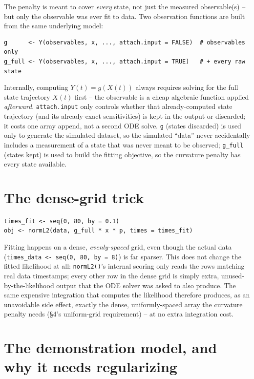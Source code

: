 \documentclass[11pt]{article}
\newcommand{\code}[1]{\texttt{#1}}
\begin{document}
The penalty is meant to cover \emph{every} state, not just the measured
observable(s) -- but only the observable was ever fit to data. Two
observation functions are built from the same underlying model:
\begin{lstlisting}
g      <- Y(observables, x, ..., attach.input = FALSE)  # observables only
g_full <- Y(observables, x, ..., attach.input = TRUE)   # + every raw state
\end{lstlisting}
Internally, computing $Y(t)=g(X(t))$ always requires solving for the full
state trajectory $X(t)$ first -- the observable is a cheap algebraic
function applied \emph{afterward}. \code{attach.input} only controls
whether that already-computed state trajectory (and its already-exact
sensitivities) is kept in the output or discarded; it costs one array
append, not a second ODE solve. \code{g} (states discarded) is used only to
generate the simulated dataset, so the simulated ``data'' never
accidentally includes a measurement of a state that was never meant to be
observed; \code{g\_full} (states kept) is used to build the fitting
objective, so the curvature penalty has every state available.

\section{The dense-grid trick}

\begin{lstlisting}
times_fit <- seq(0, 80, by = 0.1)
obj <- normL2(data, g_full * x * p, times = times_fit)
\end{lstlisting}
Fitting happens on a dense, \emph{evenly-spaced} grid, even though the
actual data (\code{times\_data <- seq(0, 80, by = 8)}) is far sparser. This
does not change the fitted likelihood at all: \code{normL2()}'s internal
scoring only reads the rows matching real data timestamps; every other row
in the dense grid is simply extra, unused-by-the-likelihood output that the
ODE solver was asked to also produce. The same expensive integration that
computes the likelihood therefore produces, as an unavoidable side effect,
exactly the dense, uniformly-spaced array the curvature penalty needs
(\S4's uniform-grid requirement) -- at no extra integration cost.

\section{The demonstration model, and why it needs regularizing}
\end{document}
